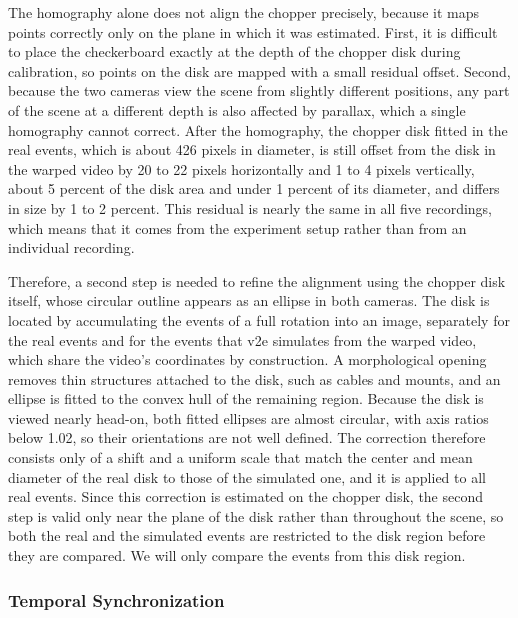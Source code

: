 The homography alone does not align the chopper precisely, because it maps points correctly only on the plane in which it was estimated. First, it is difficult to place the checkerboard exactly at the depth of the chopper disk during calibration, so points on the disk are mapped with a small residual offset. Second, because the two cameras view the scene from slightly different positions, any part of the scene at a different depth is also affected by parallax, which a single homography cannot correct. After the homography, the chopper disk fitted in the real events, which is about 426 pixels in diameter, is still offset from the disk in the warped video by 20 to 22 pixels horizontally and 1 to 4 pixels vertically, about 5 percent of the disk area and under 1 percent of its diameter, and differs in size by 1 to 2 percent. This residual is nearly the same in all five recordings, which means that it comes from the experiment setup rather than from an individual recording.

Therefore, a second step is needed to refine the alignment using the chopper disk itself, whose circular outline appears as an ellipse in both cameras. The disk is located by accumulating the events of a full rotation into an image, separately for the real events and for the events that v2e simulates from the warped video, which share the video's coordinates by construction. A morphological opening removes thin structures attached to the disk, such as cables and mounts, and an ellipse is fitted to the convex hull of the remaining region. Because the disk is viewed nearly head-on, both fitted ellipses are almost circular, with axis ratios below 1.02, so their orientations are not well defined. The correction therefore consists only of a shift and a uniform scale that match the center and mean diameter of the real disk to those of the simulated one, and it is applied to all real events. Since this correction is estimated on the chopper disk, the second step is valid only near the plane of the disk rather than throughout the scene, so both the real and the simulated events are restricted to the disk region before they are compared. We will only compare the events from this disk region. 

\subsubsection{Temporal Synchronization}
\label{sec:temporal-sync}

